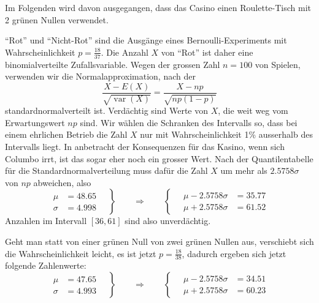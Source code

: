 \begin{loesung}
Im Folgenden wird davon ausgegangen, dass das Casino einen Roulette-Tisch
mit 2 grünen Nullen verwendet.
\begin{teilaufgaben}
\item
``Rot'' und ``Nicht-Rot'' sind die Ausgänge eines Bernoulli-Experiments mit
Wahrscheinlichkeit $p=\frac{18}{37}$. Die Anzahl $X$ von ``Rot'' ist daher
eine binomialverteilte Zufallsvariable. Wegen der grossen Zahl $n=100$
von Spielen, verwenden wir die Normalapproximation, nach der 
\[
\frac{X-E(X)}{\sqrt{\operatorname{var}(X)}}=\frac{X-np}{\sqrt{np(1-p)}}
\]
standardnormalverteilt ist. Verdächtig sind Werte von $X$, die weit
weg vom Erwartungswert $np$ sind. Wir wählen die Schranken des Intervalls
so, dass bei einem ehrlichen Betrieb die Zahl $X$ nur mit Wahrscheinlichkeit
1\% ausserhalb des Intervalls liegt. In anbetracht der Konsequenzen
für das Kasino, wenn sich Columbo irrt, ist das sogar eher noch ein
grosser Wert. Nach der Quantilentabelle für die
Standardnormalverteilung muss dafür die Zahl $X$ um mehr als $2.5758\sigma$
von $np$ abweichen, also
\[
\left.
\begin{aligned}
\mu&=48.65\\
\sigma&=4.998
\end{aligned}
\quad
\right\}
\qquad
\Rightarrow
\qquad
\left\{\quad
\begin{aligned}
\mu - 2.5758\sigma&=35.77\\
\mu + 2.5758\sigma&=61.52
\end{aligned}
\right.
\]
Anzahlen im Intervall $[36,61]$ sind also unverdächtig.

Geht man statt von einer grünen Null von zwei grünen Nullen aus, verschiebt
sich die Wahrscheinlichkeit leicht, es ist jetzt $p=\frac{18}{38}$, dadurch
ergeben sich jetzt folgende Zahlenwerte:
\[
\left.
\begin{aligned}
\mu&=47.65\\
\sigma&=4.993
\end{aligned}
\quad
\right\}
\qquad
\Rightarrow
\qquad
\left\{\quad
\begin{aligned}
\mu - 2.5758\sigma&=34.51\\
\mu + 2.5758\sigma&=60.23
\end{aligned}
\right.
\]


\end{teilaufgaben}
\end{loesung}
